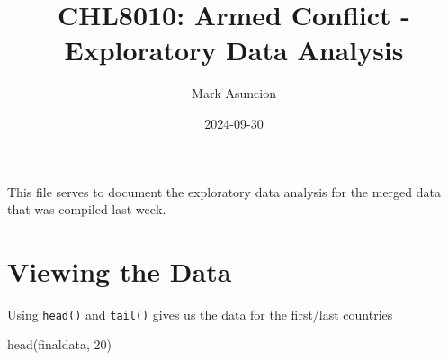 \documentclass[
  11pt,
  letterpaper,
  DIV=11,
  numbers=noendperiod]{scrartcl}
\title{CHL8010: Armed Conflict - Exploratory Data Analysis}
\author{Mark Asuncion}
\date{2024-09-30}
\newenvironment{Shaded}{\begin{snugshade}}{\end{snugshade}}
\newcommand{\DecValTok}[1]{\textcolor[rgb]{0.68,0.00,0.00}{#1}}
\newcommand{\FunctionTok}[1]{\textcolor[rgb]{0.28,0.35,0.67}{#1}}
\newcommand{\NormalTok}[1]{\textcolor[rgb]{0.00,0.23,0.31}{#1}}
\begin{document}
\maketitle


This file serves to document the exploratory data analysis for the
merged data that was compiled last week.

\section{Viewing the Data}\label{viewing-the-data}

Using \texttt{head()} and \texttt{tail()} gives us the data for the
first/last countries

\begin{Shaded}
\begin{Highlighting}[]
\FunctionTok{head}\NormalTok{(finaldata, }\DecValTok{20}\NormalTok{)}
\end{Highlighting}
\end{Shaded}
\end{document}

